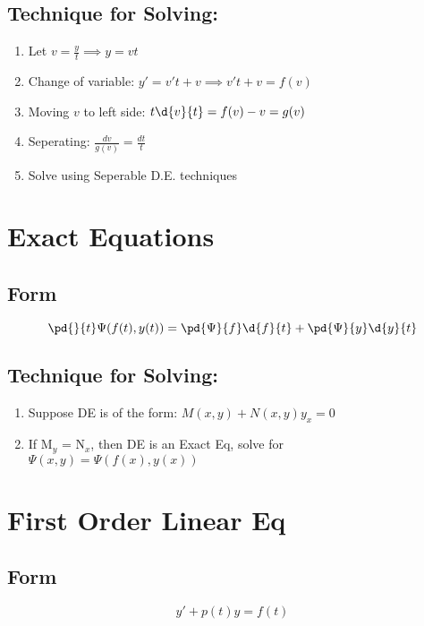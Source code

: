 \documentclass[11pt]{article}
\begin{document}
\subsection{Technique for Solving:}
\label{sec-7.2}

\begin{enumerate}
\item Let $v=\frac{y}{t} \implies y=vt$
\item Change of variable: $y'=v't+v \implies v't+v=f(v)$
\item Moving $v$ to left side: $t\d{v}{t}=f(v)-v = g(v)$
\item Seperating: $\frac{dv}{g(v)}=\frac{dt}{t}$
\item Solve using Seperable D.E. techniques
\end{enumerate}
\section{Exact Equations}
\label{sec-8}

\subsection{Form}
\label{sec-8.1}

   \begin{equation}
   \pd{}{t}\Psi(f(t),y(t)) = \pd{\Psi}{f}\d{f}{t} + \pd{\Psi}{y}\d{y}{t}
   \end{equation}
\subsection{Technique for Solving:}
\label{sec-8.2}

\begin{enumerate}
\item Suppose DE is of the form: $M(x,y) + N(x,y) y_x = 0$
\item If M$_y$ = N$_x$, then DE is an Exact Eq, solve for $\Psi(x,y) = \Psi( f(x), y(x))$
\end{enumerate}
\section{First Order Linear Eq}
\label{sec-9}

\subsection{Form}
\label{sec-9.1}

   \begin{equation}
   y' + p(t)y = f(t)
   \end{equation}
\end{document}
